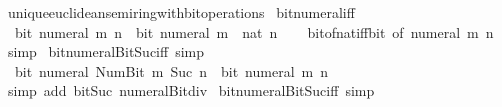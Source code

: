\begin{isabellebody}
%
\isadelimdocument
%
\endisadelimdocument
{}\isamarkupfalse%
\ unique{\isacharunderscore}{\kern0pt}euclidean{\isacharunderscore}{\kern0pt}semiring{\isacharunderscore}{\kern0pt}with{\isacharunderscore}{\kern0pt}bit{\isacharunderscore}{\kern0pt}operations\isanewline
{}\isanewline
\isanewline
{}\isamarkupfalse%
\ bit{\isacharunderscore}{\kern0pt}numeral{\isacharunderscore}{\kern0pt}iff{\isacharcolon}{\kern0pt}\isanewline
\ \ {\isacartoucheopen}bit\ {\isacharparenleft}{\kern0pt}numeral\ m{\isacharparenright}{\kern0pt}\ n\ {\isasymlongleftrightarrow}\ bit\ {\isacharparenleft}{\kern0pt}numeral\ m\ {\isacharcolon}{\kern0pt}{\isacharcolon}{\kern0pt}\ nat{\isacharparenright}{\kern0pt}\ n{\isacartoucheclose}\isanewline
%
\isadelimproof
\ \ %
\endisadelimproof
%
\isatagproof
{}\isamarkupfalse%
\ bit{\isacharunderscore}{\kern0pt}of{\isacharunderscore}{\kern0pt}nat{\isacharunderscore}{\kern0pt}iff{\isacharunderscore}{\kern0pt}bit\ {\isacharbrackleft}{\kern0pt}of\ {\isacartoucheopen}numeral\ m{\isacartoucheclose}\ n{\isacharbrackright}{\kern0pt}\ \isamarkupfalse%
\ simp%
\endisatagproof
{\isafoldproof}%
%
\isadelimproof
\isanewline
%
\endisadelimproof
\isanewline
{}\isamarkupfalse%
\ bit{\isacharunderscore}{\kern0pt}numeral{\isacharunderscore}{\kern0pt}Bit{}{\isacharunderscore}{\kern0pt}Suc{\isacharunderscore}{\kern0pt}iff\ {\isacharbrackleft}{\kern0pt}simp{\isacharbrackright}{\kern0pt}{\isacharcolon}{\kern0pt}\isanewline
\ \ {\isacartoucheopen}bit\ {\isacharparenleft}{\kern0pt}numeral\ {\isacharparenleft}{\kern0pt}Num{\isachardot}{\kern0pt}Bit{}\ m{\isacharparenright}{\kern0pt}{\isacharparenright}{\kern0pt}\ {\isacharparenleft}{\kern0pt}Suc\ n{\isacharparenright}{\kern0pt}\ {\isasymlongleftrightarrow}\ bit\ {\isacharparenleft}{\kern0pt}numeral\ m{\isacharparenright}{\kern0pt}\ n{\isacartoucheclose}\isanewline
%
\isadelimproof
\ \ %
\endisadelimproof
%
\isatagproof
{}\isamarkupfalse%
\ {\isacharparenleft}{\kern0pt}simp\ add{\isacharcolon}{\kern0pt}\ bit{\isacharunderscore}{\kern0pt}Suc\ numeral{\isacharunderscore}{\kern0pt}Bit{}{\isacharunderscore}{\kern0pt}div{\isacharunderscore}{\kern0pt}{}{\isacharparenright}{\kern0pt}%
\endisatagproof
{\isafoldproof}%
%
\isadelimproof
\isanewline
%
\endisadelimproof
\isanewline
{}\isamarkupfalse%
\ bit{\isacharunderscore}{\kern0pt}numeral{\isacharunderscore}{\kern0pt}Bit{}{\isacharunderscore}{\kern0pt}Suc{\isacharunderscore}{\kern0pt}iff\ {\isacharbrackleft}{\kern0pt}simp{\isacharbrackright}{\kern0pt}{\isacharcolon}{\kern0pt}\isanewline

\end{isabellebody}
